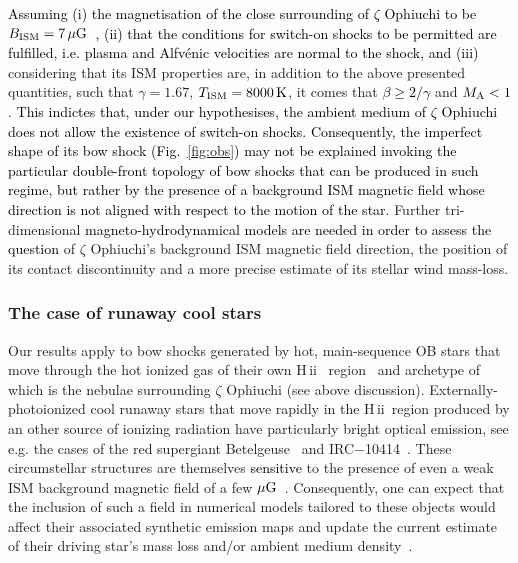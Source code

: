 \documentclass[useAMS,usenatbib]{mn2e}
\newcommand\hii{H\,{\sc ii} \,}
\begin{document}
\textcolor{black}{
Assuming (i) the magnetisation of the close surrounding of $\zeta$ Ophiuchi to be 
$B_{\rm ISM}=7\, \mu \rm G$~\citep{mackey_mnras_2013}, (ii) that the 
conditions for switch-on shocks to be permitted are fulfilled, i.e. plasma and Alfv\' enic 
velocities are normal to the shock, and (iii)} considering that its
ISM properties are, in addition to the above presented quantities, such that
$\gamma=1.67$, $T_{\rm ISM}=8000\, \rm  K$, it comes that \textcolor{black}{$\beta \ge 2/\gamma$} 
and $M_{\rm A}<1$. \textcolor{black}{This indictes that, under our hypothesises, 
the ambient medium of $\zeta$ Ophiuchi  
does not allow the existence of switch-on shocks. Consequently, the imperfect 
shape of its bow shock (Fig.~\ref{fig:obs}) may not be explained invoking the
particular double-front topology of bow shocks that can be produced in such regime, but 
rather by the presence of a background ISM magnetic field whose direction is
not aligned with respect to the motion of the star.} Further
tri-dimensional \textcolor{black}{magneto-hydrodynamical models are needed in order to
assess the question} of $\zeta$ Ophiuchi's background ISM magnetic field direction, the
position of its contact discontinuity and a more precise estimate of its stellar
wind mass-loss. 



\subsubsection{The case of runaway cool stars}
\label{sect:coolstars}


Our results apply to bow shocks generated by hot, main-sequence OB stars that 
move through the hot ionized gas of their own \hii 
region~\citep{raga_rmxaa_33_1997} and archetype of which is the nebulae 
surrounding $\zeta$ Ophiuchi (see above discussion). Externally-photoionized 
cool runaway stars that move rapidly in the \hii region produced by an other 
source of ionizing radiation have particularly bright optical emission, see e.g. 
the cases of the red supergiant Betelgeuse~\citep{mohamed_aa_541_2012,2014Natur.512..282M} and 
IRC$-$10414~\citep{meyer_mnras_439_2014}. These circumstellar structures are 
themselves \textcolor{black}{sensitive} to the presence of even a weak ISM 
background magnetic field of a few $\mu \rm G$~\citep{vanmarle_aa_561_2014}. 
Consequently, one can expect that the inclusion of such a field in numerical 
models tailored to these objects would affect their associated synthetic 
emission maps and update the current estimate of their driving star's mass loss 
and/or ambient medium density~\citep{meyer_mnras_459_2016}.  
\end{document}
